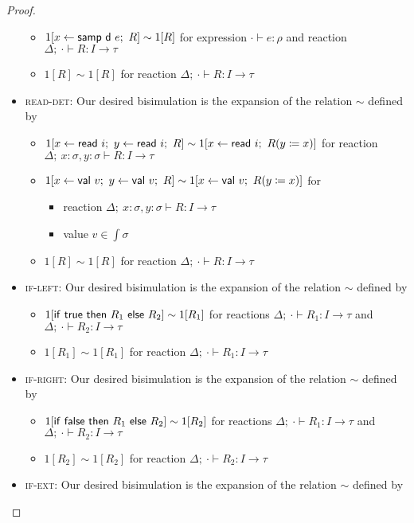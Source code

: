 \begin{proof}
\begin{itemize}
\begin{itemize}
\item $1[x \leftarrow \mathsf{samp} \ \mathsf{d} \ e; \ R] \sim 1[R]$ for expression $\cdot \vdash e : \rho$ and reaction $\Delta; \ \cdot \vdash R : I \to \tau$
\item $1[R] \sim 1[R]$ for reaction $\Delta; \ \cdot \vdash R : I \to \tau$
\end{itemize}
\item \textsc{read-det}: Our desired bisimulation is the expansion of the relation $\sim$ defined by
\begin{itemize}
\item $1[x \leftarrow \mathsf{read} \ i; \ y \leftarrow \mathsf{read} \ i; \ R] \sim 1[x \leftarrow \mathsf{read} \ i; \ R(y \coloneqq x)]$ for reaction $\Delta; \ x : \sigma, y : \sigma \vdash R : I \to \tau$
\item $1[x \leftarrow \mathsf{val} \ v; \ y \leftarrow \mathsf{val} \ v; \ R] \sim 1[x \leftarrow \mathsf{val} \ v; \ R(y \coloneqq x)]$ for
\begin{itemize}
\item reaction $\Delta; \ x : \sigma, y : \sigma \vdash R : I \to \tau$ 
\item value $v \in \int{\sigma}$
\end{itemize}
\item $1[R] \sim 1[R]$ for reaction $\Delta; \ \cdot \vdash R : I \to \tau$
\end{itemize}
\item \textsc{if-left}: Our desired bisimulation is the expansion of the relation $\sim$ defined by
\begin{itemize}
\item $1[\mathsf{if} \ \mathsf{true} \ \mathsf{then} \ R_1 \ \mathsf{else} \ R_2] \sim 1[R_1]$ for reactions $\Delta; \ \cdot \vdash R_1 : I \to \tau$ and $\Delta; \ \cdot \vdash R_2 : I \to \tau$
\item $1[R_1] \sim 1[R_1]$ for reaction $\Delta; \ \cdot \vdash R_1 : I \to \tau$
\end{itemize}
\item \textsc{if-right}: Our desired bisimulation is the expansion of the relation $\sim$ defined by
\begin{itemize}
\item $1[\mathsf{if} \ \mathsf{false} \ \mathsf{then} \ R_1 \ \mathsf{else} \ R_2] \sim 1[R_2]$ for reactions $\Delta; \ \cdot \vdash R_1 : I \to \tau$ and $\Delta; \ \cdot \vdash R_2 : I \to \tau$
\item $1[R_2] \sim 1[R_2]$ for reaction $\Delta; \ \cdot \vdash R_2 : I \to \tau$
\end{itemize}
\item \textsc{if-ext}: Our desired bisimulation is the expansion of the relation $\sim$ defined by

\end{itemize}
\end{proof}
